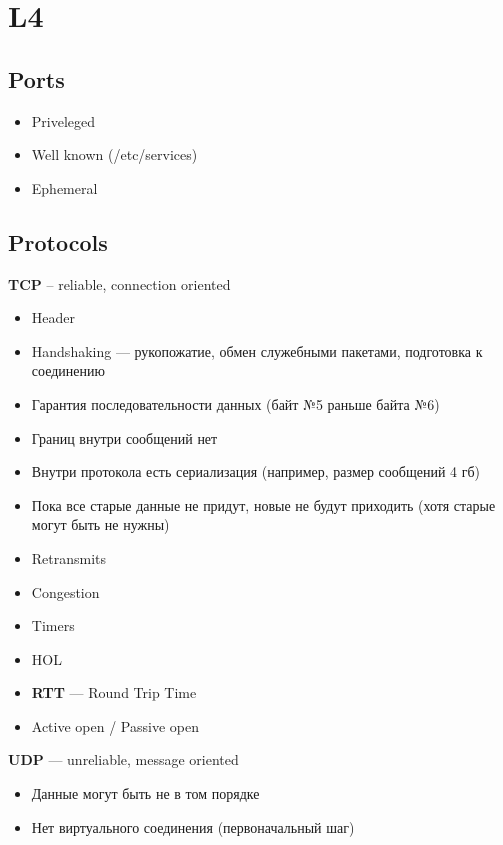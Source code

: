 \documentclass[../../lectures.tex]{subfiles}
\begin{document}
\newpage
\section{L4}
\subsection{Ports}
\begin{itemize}
    \item Priveleged
    \item Well known (/etc/services)
    \item Ephemeral
\end{itemize}

\subsection{Protocols}
\textbf{TCP} -- reliable, connection oriented
\begin{itemize}
    \item Header
    \item Handshaking --- рукопожатие, обмен служебными пакетами, подготовка к соединению
    \item Гарантия последовательности данных (байт №5 раньше байта №6)
    \item Границ внутри сообщений нет
    \item Внутри протокола есть сериализация (например, размер сообщений 4 гб)
    \item Пока все старые данные не придут, новые не будут приходить (хотя старые могут быть не нужны)
    \item Retransmits
    \item Congestion
    \item Timers
    \item HOL
    \item \textbf{RTT} --- Round Trip Time
    \item Active open / Passive open
\end{itemize}

\textbf{UDP} --- unreliable, message oriented
\begin{itemize}
    \item Данные могут быть не в том порядке
    \item Нет виртуального соединения (первоначальный шаг)
\end{itemize}
\end{document}
